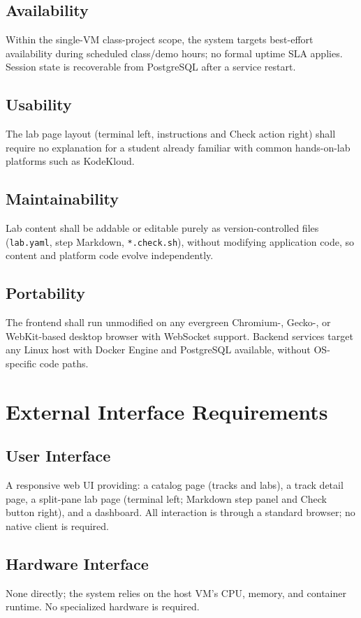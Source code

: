 \documentclass[11pt]{article}
\begin{document}
\subsection{Availability}
Within the single-VM class-project scope, the system targets
best-effort availability during scheduled class/demo hours; no formal
uptime SLA applies. Session state is recoverable from PostgreSQL after
a service restart.

\subsection{Usability}
The lab page layout (terminal left, instructions and Check action
right) shall require no explanation for a student already familiar
with common hands-on-lab platforms such as KodeKloud.

\subsection{Maintainability}
Lab content shall be addable or editable purely as version-controlled
files (\texttt{lab.yaml}, step Markdown, \texttt{*.check.sh}), without
modifying application code, so content and platform code evolve
independently.

\subsection{Portability}
The frontend shall run unmodified on any evergreen Chromium-, Gecko-,
or WebKit-based desktop browser with WebSocket support. Backend
services target any Linux host with Docker Engine and PostgreSQL
available, without OS-specific code paths.

\section{External Interface Requirements}

\subsection{User Interface}
A responsive web UI providing: a catalog page (tracks and labs), a
track detail page, a split-pane lab page (terminal left; Markdown step
panel and Check button right), and a dashboard. All interaction is
through a standard browser; no native client is required.

\subsection{Hardware Interface}
None directly; the system relies on the host VM's CPU, memory, and
container runtime. No specialized hardware is required.
\end{document}
